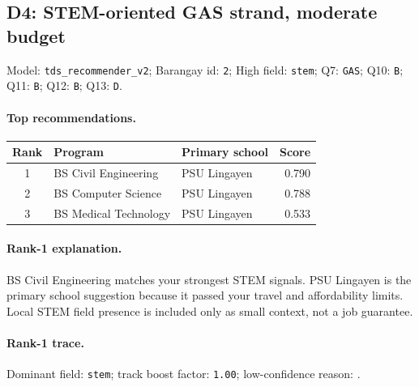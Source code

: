 \subsection*{D4: STEM-oriented GAS strand, moderate budget}
\noindent Model: \texttt{tds\_recommender\_v2}; Barangay id: \texttt{2}; High field: \texttt{stem}; Q7: \texttt{GAS}; Q10: \texttt{B}; Q11: \texttt{B}; Q12: \texttt{B}; Q13: \texttt{D}.

\paragraph{Top recommendations.}
\begingroup\small\setlength{\tabcolsep}{6pt}
\noindent\begin{tabular}{@{}c p{4.4cm} p{4.4cm} r@{}}
\toprule
Rank & Program & Primary school & Score \\
\midrule
1 & BS Civil Engineering & PSU Lingayen & 0.790 \\
2 & BS Computer Science & PSU Lingayen & 0.788 \\
3 & BS Medical Technology & PSU Lingayen & 0.533 \\
\bottomrule
\end{tabular}\endgroup

\paragraph{Rank-1 explanation.}
BS Civil Engineering matches your strongest STEM signals. PSU Lingayen is the primary school suggestion because it passed your travel and affordability limits. Local STEM field presence is included only as small context, not a job guarantee.

\paragraph{Rank-1 trace.}
Dominant field: \texttt{stem}; track boost factor: \texttt{1.00}; low-confidence reason: \texttt{}.
